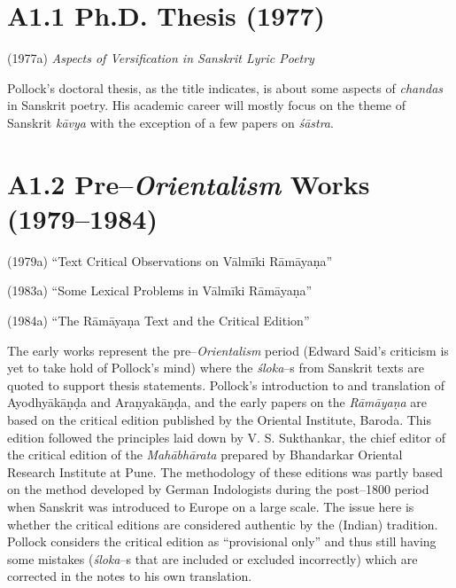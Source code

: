 \vspace{-.3cm}

\section*{A1.1 Ph.D. Thesis (1977)}

\vspace{-.2cm}

(1977a)\textit{ Aspects of Versification in Sanskrit Lyric Poetry}

Pollock’s doctoral thesis, as the title indicates, is about some aspects of \textit{chandas} in Sanskrit poetry. His academic career will mostly focus on the theme of Sanskrit \textit{kāvya} with the exception of a few papers on \textit{śāstra}.

\vspace{-.3cm}

\section*{A1.2 Pre–\textit{Orientalism} Works (1979–1984)}

\vspace{-.2cm}

(1979a) “Text Critical Observations on Vālmīki Rāmāyaṇa”

(1983a) “Some Lexical Problems in Vālmīki Rāmāyaṇa”

(1984a) “The Rāmāyaṇa Text and the Critical Edition”

The early works represent the pre–\textit{Orientalism} period (Edward Said’s criticism is yet to take hold of Pollock’s mind) where the \textit{śloka}–s from Sanskrit texts are quoted to support thesis statements. Pollock’s introduction to and translation of Ayodhyākāṇḍa and Araṇyakāṇḍa, and the early papers on the \textit{Rāmāyaṇa} are based on the critical edition published by the Oriental Institute, Baroda. This edition followed the principles laid down by V. S. Sukthankar, the chief editor of the critical edition of the \textit{Mahābhārata} prepared by Bhandarkar Oriental Research Institute at Pune. The methodology of these editions was partly based on the method developed by German Indologists during the post–1800 period when Sanskrit was introduced to Europe on a large scale. The issue here is whether the critical editions are considered authentic by the (Indian) tradition. Pollock considers the critical edition as “provisional only” and thus still having some mistakes (\textit{śloka}–s that are included or excluded incorrectly) which are corrected in the notes to his own translation.

